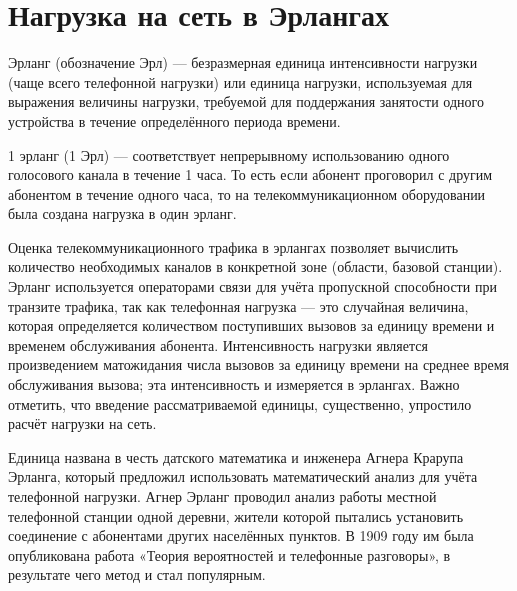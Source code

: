 \section{Нагрузка на сеть в Эрлангах}

Эрланг (обозначение Эрл) — безразмерная единица интенсивности нагрузки (чаще всего телефонной
нагрузки) или единица нагрузки, используемая для выражения величины нагрузки, требуемой для 
поддержания занятости одного устройства в течение определённого периода времени.

1 эрланг (1 Эрл) --- соответствует непрерывному использованию одного голосового канала в течение
1 часа. То есть если абонент проговорил с другим абонентом в течение одного часа, то на 
телекоммуникационном оборудовании была создана нагрузка в один эрланг.

Оценка телекоммуникационного трафика в эрлангах позволяет вычислить количество необходимых каналов
в конкретной зоне (области, базовой станции). Эрланг используется операторами связи для учёта 
пропускной способности при транзите трафика, так как телефонная нагрузка --- это случайная величина,
которая определяется количеством поступивших вызовов за единицу времени и временем обслуживания
абонента. Интенсивность нагрузки является произведением матожидания числа вызовов за единицу времени
на среднее время обслуживания вызова; эта интенсивность и измеряется в эрлангах. Важно отметить, что
введение рассматриваемой единицы, существенно, упростило расчёт нагрузки на сеть.

Единица названа в честь датского математика и инженера Агнера Крарупа Эрланга, который предложил
использовать математический анализ для учёта телефонной нагрузки. Агнер Эрланг проводил анализ
работы местной телефонной станции одной деревни, жители которой пытались установить соединение с
абонентами других населённых пунктов. В 1909 году им была опубликована работа «Теория вероятностей
и телефонные разговоры», в результате чего метод и стал популярным.